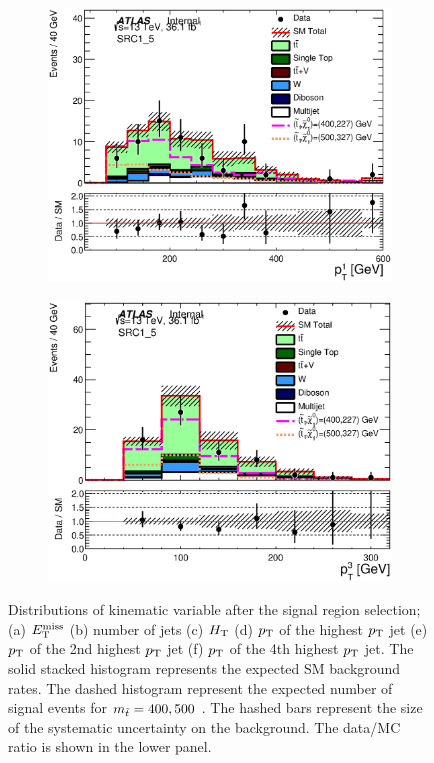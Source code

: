 \begin{figure}[h!]
\begin{center}
\begin{subfigure}[b]{0.40\textwidth}
    	 \includegraphics[width=\textwidth]{figures/plotRegion/JetPt_1__SRC1_5.eps}
                \caption{ }
    \end{subfigure}
    \begin{subfigure}[b]{0.40\textwidth}    
    	 \includegraphics[width=\textwidth]{figures/plotRegion/JetPt_3__SRC1_5.eps}
               \caption{ }
    \end{subfigure}
     \caption[Distributions of kinematic variable after the signal region selection]{ Distributions of kinematic variable after the signal region selection; (a) $E_{\mathrm{T}}^{\mathrm{miss}}$ (b) number of jets (c) $H_{\mathrm{T}}$ (d) $p_{\mathrm{T}}$ of the highest $p_{\mathrm{T}}$ jet (e) $p_{\mathrm{T}}$ of the 2nd highest $p_{\mathrm{T}}$ jet (f) $p_{\mathrm{T}}$ of the 4th highest $p_{\mathrm{T}}$ jet.  The solid stacked histogram represents the expected SM background rates. The dashed histogram represent the expected number of signal events for $m_{\tilde{t}} = 400,500$ \gev.  The hashed bars represent the size of the systematic uncertainty on the background.  The data/MC ratio is shown in the lower panel. }
  \label{fig:SR1}
    \end{center}
\end{figure}

